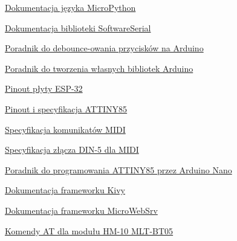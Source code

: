 \documentclass[eng,printmode]{mgr}
\begin{document}
\begin{thebibliography}{9}

\bibitem{}
\href{http://docs.micropython.org/en/v1.11/}{Dokumentacja języka MicroPython}

\bibitem{}
\href{https://www.arduino.cc/en/Reference/softwareSerial}{Dokumentacja biblioteki SoftwareSerial}

\bibitem{}
\href{https://www.arduino.cc/en/tutorial/debounce}{Poradnik do debounce-owania przycisków na Arduino}

\bibitem{}
\href{https://www.arduino.cc/en/Hacking/LibraryTutorial}{Poradnik do tworzenia własnych bibliotek Arduino}

\bibitem{}
\href{https://circuits4you.com/2018/12/31/esp32-devkit-esp32-wroom-gpio-pinout/}{Pinout płyty ESP-32}

\bibitem{}
\href{https://components101.com/microcontroller/attiny85-pinout-datasheet}{Pinout i specyfikacja ATTINY85}

\bibitem{}
\href{https://www.midi.org/specifications-old/item/table-1-summary-of-midi-message}{Specyfikacja komunikatów MIDI}

\bibitem{}
\href{https://www.midi.org/articles-old/updated-how-to-make-your-own-3-5mm-mini-stereo-trs-to-midi-5-pin-din-cables}{Specyfikacja złącza DIN-5 dla MIDI}

\bibitem{}
\href{https://www.instructables.com/id/Arduino-Nano-as-Attiny-85-programmer-and-5-LED-POV/}{Poradnik do programowania ATTINY85 przez Arduino Nano}

\bibitem{}
\href{https://kivy.org/doc/stable-1.11.0/api-kivy.html}{Dokumentacja frameworku Kivy}

\bibitem{}
\href{https://github.com/jczic/MicroWebSrv}{Dokumentacja frameworku MicroWebSrv}

\bibitem{}
\href{http://denethor.wlu.ca/arduino/MLT-BT05-AT-commands-TRANSLATED.pdf}{Komendy AT dla modułu HM-10 MLT-BT05}

\end{thebibliography}

\end{document}
